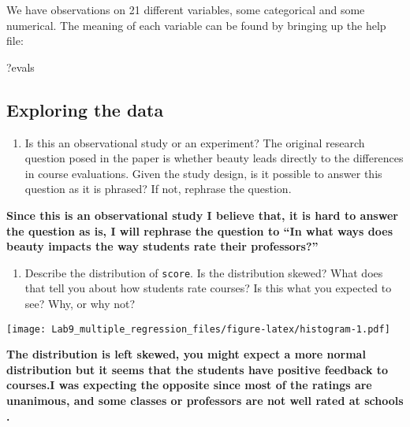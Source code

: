 \documentclass[
]{article}
\newenvironment{Shaded}{\begin{snugshade}}{\end{snugshade}}
\newcommand{\FunctionTok}[1]{\textcolor[rgb]{0.13,0.29,0.53}{\textbf{#1}}}
\newcommand{\NormalTok}[1]{#1}
\newcommand{\SpecialCharTok}[1]{\textcolor[rgb]{0.81,0.36,0.00}{\textbf{#1}}}
\providecommand{\tightlist}{%
  \setlength{\itemsep}{0pt}\setlength{\parskip}{0pt}}
\begin{document}
We have observations on 21 different variables, some categorical and
some numerical. The meaning of each variable can be found by bringing up
the help file:

\begin{Shaded}
\begin{Highlighting}[]
\NormalTok{?evals}
\end{Highlighting}
\end{Shaded}

\subsection{Exploring the data}\label{exploring-the-data}

\begin{enumerate}
\def\labelenumi{\arabic{enumi}.}
\tightlist
\item
  Is this an observational study or an experiment? The original research
  question posed in the paper is whether beauty leads directly to the
  differences in course evaluations. Given the study design, is it
  possible to answer this question as it is phrased? If not, rephrase
  the question.
\end{enumerate}

\textbf{Since this is an observational study I believe that, it is hard
to answer the question as is, I will rephrase the question to ``In what
ways does beauty impacts the way students rate their professors?''}

\begin{enumerate}
\def\labelenumi{\arabic{enumi}.}
\setcounter{enumi}{1}
\tightlist
\item
  Describe the distribution of \texttt{score}. Is the distribution
  skewed? What does that tell you about how students rate courses? Is
  this what you expected to see? Why, or why not?
\end{enumerate}

\begin{Shaded}
\end{Shaded}

\texttt{[image: Lab9\_multiple\_regression\_files/figure-latex/histogram-1.pdf]}

\textbf{The distribution is left skewed, you might expect a more normal
distribution but it seems that the students have positive feedback to
courses.I was expecting the opposite since most of the ratings are
unanimous, and some classes or professors are not well rated at schools
.}
\end{document}
